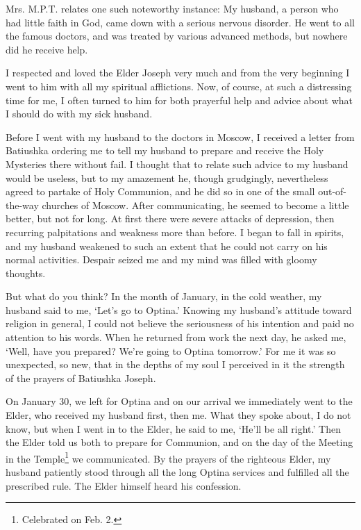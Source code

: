 \begin{longquote}{Mrs. M.P.T. relates one such noteworthy instance:}
My husband, a person who had little faith in God, came down with a serious nervous disorder. He went to all the famous doctors, and was treated by various advanced methods, but nowhere did he receive help.

I respected and loved the Elder Joseph very much and from the very beginning I went to him with all my spiritual afflictions. Now, of course, at such a distressing time for me, I often turned to him for both prayerful help and advice about what I should do with my sick husband.

Before I went with my husband to the doctors in Moscow, I received a letter from Batiushka ordering me to tell my husband to prepare and receive the Holy Mysteries there without fail. I thought that to relate such advice to my husband would be useless, but to my amazement he, though grudgingly, nevertheless agreed to partake of Holy Communion, and he did so in one of the small out-of-the-way churches of Moscow. After communicating, he seemed to become a little better, but not for long. At first there were severe attacks of depression, then recurring palpitations and weakness more than before. I began to fall in spirits, and my husband weakened to such an extent that he could not carry on his normal activities. Despair seized me and my mind was filled with gloomy thoughts.

But what do you think? In the month of January, in the cold weather, my husband said to me, `Let's go to Optina.' Knowing my husband's attitude toward religion in general, I could not believe the seriousness of his intention and paid no attention to his words. When he returned from work the next day, he asked me, `Well, have you prepared? We're going to Optina tomorrow.' For me it was so unexpected, so new, that in the depths of my soul I perceived in it the strength of the prayers of Batiushka Joseph.

On January 30, we left for Optina and on our arrival we immediately went to the Elder, who received my husband first, then me. What they spoke about, I do not know, but when I went in to the Elder, he said to me, `He'll be all right.' Then the Elder told us both to prepare for Communion, and on the day of the Meeting in the Temple\footnote{Celebrated on Feb. 2.} we communicated. By the prayers of the righteous Elder, my husband patiently stood through all the long Optina services and fulfilled all the prescribed rule. The Elder himself heard his confession.


\end{longquote}
